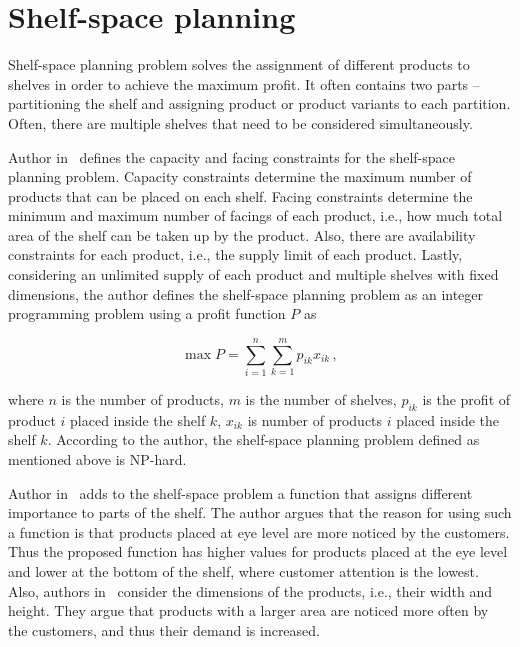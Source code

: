 \section{Shelf-space planning}\label{sec:shelf-space-planning}

Shelf-space planning problem solves the assignment of different products to shelves in order to achieve the maximum profit.
It often contains two parts – partitioning the shelf and assigning product or product variants to each partition.
Often, there are multiple shelves that need to be considered simultaneously.

Author in~\cite{yangStudyShelfSpace1999} defines the capacity and facing constraints for the shelf-space planning problem.
Capacity constraints determine the maximum number of products that can be placed on each shelf.
Facing constraints determine the minimum and maximum number of facings of each product, i.e., how much total area of the shelf can be taken up by the product.
Also, there are availability constraints for each product, i.e., the supply limit of each product.
Lastly, considering an unlimited supply of each product and multiple shelves with fixed dimensions,
the author defines the shelf-space planning problem as an integer programming problem using a profit function $P$ as

\begin{equation}
    \max P = \sum\limits_{i=1}^n\sum\limits_{k=1}^mp_{ik} x_{ik}\,,
    \label{eq:shelf-space-planning}
\end{equation}

where $n$ is the number of products, $m$ is the number of shelves, $p_{ik}$ is the profit of product $i$ placed inside the shelf $k$, $x_{ik}$
is number of products $i$ placed inside the shelf $k$.
According to the author, the shelf-space planning problem defined as mentioned above is NP-hard.

Author in~\cite{hwangGeneticAlgorithmApproach2009} adds to the shelf-space problem a function that assigns
different importance to parts of the shelf.
The author argues that the reason for using such a function is that products placed at eye level are more noticed by the customers.
Thus the proposed function has higher values for products placed at the eye level and lower at the bottom of the shelf,
where customer attention is the lowest.
Also, authors in~\cite{hubnerMaximizingProfitAssortment2020} consider the dimensions of the products, i.e., their width and height.
They argue that products with a larger area are noticed more often by the customers, and thus their demand is increased.

